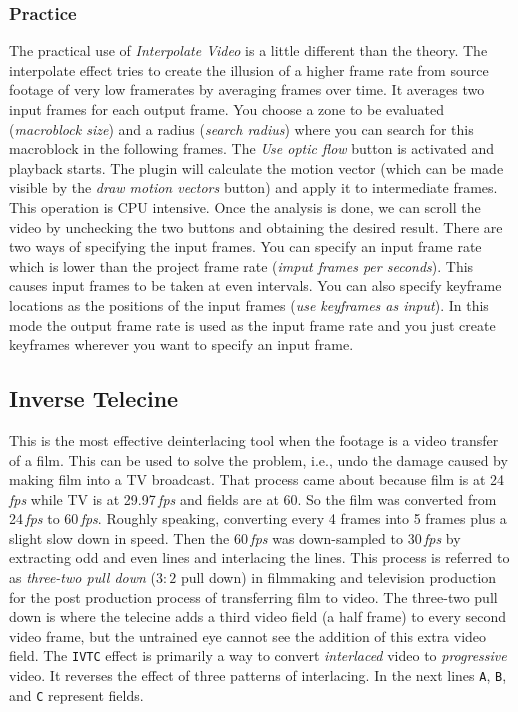 \subsubsection*{Practice}
\label{ssub:practice}

The practical use of \textit{Interpolate Video} is a little different than the theory. The interpolate effect tries to create the illusion of a higher frame rate from source footage of very low framerates by averaging frames over time. It averages two input frames for each output frame. You choose a zone to be evaluated (\textit{macroblock size}) and a radius (\textit{search radius}) where you can search for this macroblock in the following frames. The \textit{Use optic flow} button is activated and playback starts. The plugin will calculate the motion vector (which can be made visible by the \textit{draw motion vectors} button) and apply it to intermediate frames. This operation is CPU intensive. Once the analysis is done, we can scroll the video by unchecking the two buttons and obtaining the desired result. There are two ways of specifying the input frames. You can specify an input frame rate which is lower than the project frame rate (\textit{imput frames per seconds}). This causes input frames to be taken at even intervals. You can also specify keyframe locations as the positions of the input frames (\textit{use keyframes as input}). In this mode the output frame rate is used as the input frame rate and you just create keyframes wherever you want to specify an input frame.

\subsection{Inverse Telecine}%
\label{sub:inverse_telecine}

This is the most effective deinterlacing tool when the footage is a video transfer of a film. This can be used to solve the problem, i.e., undo the damage caused by making film into a TV broadcast. 
That process came about because film is at 24\,\emph{fps} while TV is at 29.97\,\emph{fps} and fields are at 60. 
So the film was converted from 24\,\emph{fps} to 60\,\emph{fps}. 
Roughly speaking, converting every 4 frames into 5 frames plus a slight slow down in speed. 
Then the 60\,\emph{fps} was down-sampled to 30\,\emph{fps} by extracting odd and even lines and interlacing the lines. 
This process is referred to as \textit{three-two pull down} ($3:2$ pull down) in filmmaking and television production for the post production process of transferring film to video.
The three-two pull down is where the telecine adds a third video field (a half frame) to every second video frame, but the untrained eye cannot see the addition of this extra video field.
The \texttt{IVTC} effect is primarily a way to convert \textit{interlaced} video to \textit{progressive} video. 
It reverses the effect of three patterns of interlacing. In the next lines \texttt{A}, \texttt{B}, and \texttt{C} represent fields.

